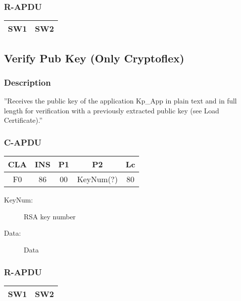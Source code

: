 \documentclass[a4paper,oneside]{article}
\begin{document}
\subsubsection*{R-APDU}

\begin{tabular}{|c|c|} \hline
SW1 & SW2 \\ \hline
\end{tabular}


\subsection{Verify Pub Key (Only Cryptoflex)}

\subsubsection*{Description}

''Receives the public key of the application Kp\_App in plain text
and in full length for verification with a previously extracted
public key (see Load Certificate).''

\subsubsection*{C-APDU}

\begin{tabular}{|c|c|c|c|c|} \hline
CLA & INS & P1 & P2 & Lc \\ \hline \hline
F0 & 86 & 00 & KeyNum(?) & 80 \\ \hline
\end{tabular}

\begin{description}
\item[KeyNum:] RSA key number
\item[Data:] Data
\end{description}

\subsubsection*{R-APDU}

\begin{tabular}{|c|c|} \hline
SW1 & SW2 \\ \hline
\end{tabular}

\end{document}

